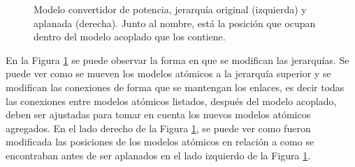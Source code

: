 \begin{figure}[H]
{\begin{minipage}[t][][b]{.59\textwidth}
        \end{minipage}%
}
        \caption{Modelo convertidor de potencia, jerarquía original (izquierda) y aplanada (derecha). Junto al nombre, está la posición que ocupan dentro del modelo acoplado que los contiene.}
        \label{fig:coupled-tree}
\end{figure}

	En la Figura \ref{fig:coupled-tree} se puede observar la forma en que se modifican las jerarquías. Se puede ver como se mueven los modelos atómicos 
        a la jerarquía superior y se modifican las conexiones de forma que se mantengan los enlaces, es decir todas las conexiones entre modelos atómicos 
        listados, después del modelo acoplado, deben ser ajustadas para tomar en cuenta los nuevos modelos atómicos agregados. 
	En el lado derecho de la Figura \ref{fig:coupled-tree}, se puede ver como fueron modificada las posiciones de los modelos atómicos en relación a como se
	encontraban antes de ser aplanados en el lado izquierdo de la Figura \ref{fig:coupled-tree}.

